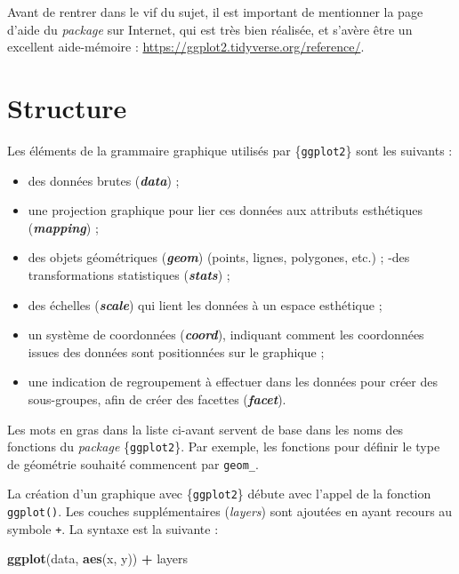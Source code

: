 \documentclass[
  11pt,
]{book}
\newenvironment{Shaded}{\begin{snugshade}}{\end{snugshade}}
\newcommand{\KeywordTok}[1]{\textcolor[rgb]{0.13,0.29,0.53}{\textbf{#1}}}
\newcommand{\NormalTok}[1]{#1}
\newcommand{\OperatorTok}[1]{\textcolor[rgb]{0.81,0.36,0.00}{\textbf{#1}}}
\newcommand{\StringTok}[1]{\textcolor[rgb]{0.31,0.60,0.02}{#1}}
\providecommand{\tightlist}{%
  \setlength{\itemsep}{0pt}\setlength{\parskip}{0pt}}
\numberwithin{equation}{section}
\numberwithin{countremarque}{section}
\begin{document}
Avant de rentrer dans le vif du sujet, il est important de mentionner la page d'aide du \emph{package} sur Internet, qui est très bien réalisée, et s'avère être un excellent aide-mémoire : \url{https://ggplot2.tidyverse.org/reference/}.

\hypertarget{graphiques_structure}{%
\section{Structure}\label{graphiques_structure}}

Les éléments de la grammaire graphique utilisés par \{\texttt{ggplot2}\} sont les suivants :

\begin{itemize}
\tightlist
\item
  des données brutes (\textbf{\emph{data}}) ;
\item
  une projection graphique pour lier ces données aux attributs esthétiques (\textbf{\emph{mapping}}) ;
\item
  des objets géométriques (\textbf{\emph{geom}}) (points, lignes, polygones, etc.) ;
  -des transformations statistiques (\textbf{\emph{stats}}) ;
\item
  des échelles (\textbf{\emph{scale}}) qui lient les données à un espace esthétique ;
\item
  un système de coordonnées (\textbf{\emph{coord}}), indiquant comment les coordonnées issues des données sont positionnées sur le graphique ;
\item
  une indication de regroupement à effectuer dans les données pour créer des sous-groupes, afin de créer des facettes (\textbf{\emph{facet}}).
\end{itemize}

Les mots en gras dans la liste ci-avant servent de base dans les noms des fonctions du \emph{package} \{\texttt{ggplot2}\}. Par exemple, les fonctions pour définir le type de géométrie souhaité commencent par \texttt{geom\_}.

La création d'un graphique avec \{\texttt{ggplot2}\} débute avec l'appel de la fonction \texttt{ggplot()}. Les couches supplémentaires (\emph{layers}) sont ajoutées en ayant recours au symbole \texttt{+}. La syntaxe est la suivante :

\begin{Shaded}
\begin{Highlighting}[]
\KeywordTok{ggplot}\NormalTok{(data, }\KeywordTok{aes}\NormalTok{(x, y)) }\OperatorTok{+}\StringTok{ }\NormalTok{layers}
\end{Highlighting}
\end{Shaded}
\end{document}
